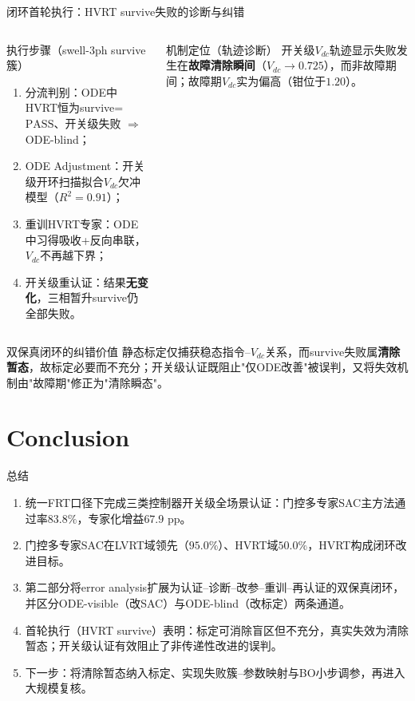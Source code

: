 \documentclass[10pt,aspectratio=169,mathserif]{beamer}
\newcommand{\warn}[1]{\textcolor{hptorange}{\textbf{#1}}}
\newcommand{\pass}{\ensuremath{\mathrm{PASS}}}
\begin{document}
\begin{frame}{闭环首轮执行：HVRT survive失败的诊断与纠错}
\begin{columns}[T,onlytextwidth]
\begin{block}{执行步骤（swell-3ph survive簇）}
\begin{enumerate}\small
  \item 分流判别：ODE中HVRT恒为survive=\pass、开关级失败 $\Rightarrow$ ODE-blind；
  \item ODE Adjustment：开关级开环扫描拟合$V_{dc}$欠冲模型（$R^2=0.91$）；
  \item 重训HVRT专家：ODE中习得吸收+反向串联，$V_{dc}$不再越下界；
  \item 开关级重认证：结果\warn{无变化}，三相暂升survive仍全部失败。
\end{enumerate}
\end{block}

\begin{block}{机制定位（轨迹诊断）}
开关级$V_{dc}$轨迹显示失败发生在\textbf{故障清除瞬间}（$V_{dc}\!\to\!0.725$），而非故障期间；故障期$V_{dc}$实为偏高（钳位于$1.20$）。
\end{block}
\end{columns}

\begin{block}{双保真闭环的纠错价值}
静态标定仅捕获稳态指令--$V_{dc}$关系，而survive失败属\textbf{清除暂态}，故标定必要而不充分；开关级认证既阻止"仅ODE改善"被误判，又将失效机制由"故障期"修正为"清除瞬态"。
\end{block}
\end{frame}

\section{Conclusion}

\begin{frame}{总结}
\begin{enumerate}
  \item 统一FRT口径下完成三类控制器开关级全场景认证：门控多专家SAC主方法通过率$83.8\%$，专家化增益$67.9$ pp。
  \item 门控多专家SAC在LVRT域领先（$95.0\%$）、HVRT域$50.0\%$，HVRT构成闭环改进目标。
  \item 第二部分将error analysis扩展为认证--诊断--改参--重训--再认证的双保真闭环，并区分ODE-visible（改SAC）与ODE-blind（改标定）两条通道。
  \item 首轮执行（HVRT survive）表明：标定可消除盲区但不充分，真实失效为清除暂态；开关级认证有效阻止了非传递性改进的误判。
  \item 下一步：将清除暂态纳入标定、实现失败簇--参数映射与BO小步调参，再进入大规模复核。
\end{enumerate}
\end{frame}
\end{document}
